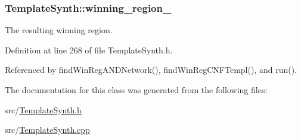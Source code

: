 \hypertarget{classTemplateSynth_a4e147629eae6a542dd87d72902df68c8}{
\subsubsection[{winning\-\_\-region\-\_\-}]{ Template\-Synth\-::winning\-\_\-region\-\_\-\hspace{0.3cm}{\ttfamily [protected]}}}\label{classTemplateSynth_a4e147629eae6a542dd87d72902df68c8}


The resulting winning region. 



Definition at line 268 of file Template\-Synth.\-h.



Referenced by find\-Win\-Reg\-A\-N\-D\-Network(), find\-Win\-Reg\-C\-N\-F\-Templ(), and run().



The documentation for this class was generated from the following files\-:\begin{DoxyCompactItemize}
\item 
src/\hyperlink{TemplateSynth_8h}{Template\-Synth.\-h}\item 
src/\hyperlink{TemplateSynth_8cpp}{Template\-Synth.\-cpp}\end{DoxyCompactItemize}
